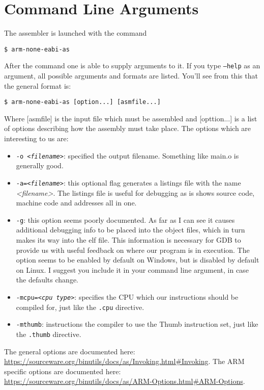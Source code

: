 \section{Command Line Arguments}
The assembler is launched with the command
\begin{lstlisting}[style=BashStyle]
$ arm-none-eabi-as
\end{lstlisting}
After the command one is able to supply arguments to it. If you type \texttt{--help} as an argument, all possible arguments and formats are listed. You'll see from this that the general format is:
\begin{lstlisting}[style=BashStyle]
$ arm-none-eabi-as [option...] [asmfile...]
\end{lstlisting}
Where [asmfile] is the input file which must be assembled and [opttion...] is a list of options describing how the assembly must take place. The options which are interesting to us are:
\begin{itemize}
  \item \texttt{-o \textit{<filename>}}: specified the output filename. Something like main.o is generally good.
  \item \texttt{-a=\textit{<filename>}}: this optional flag generates a listings file with the name \textit{<filename>}. The listings file is useful for debugging as is shows source code, machine code and addresses all in one. 
  \item \texttt{-g}: this option seems poorly documented. As far as I can see it causes additional debugging info to be placed into the object files, which in turn makes its way into the elf file. This information is necessary for GDB to provide us with useful feedback on where our program is in execution. The option seems to be enabled by default on Windows, but is disabled by default on Linux. I suggest you include it in your command line argument, in case the defaults change. 
  \item \texttt{-mcpu=\textit{<cpu type>}}: specifies the CPU which our instructions should be compiled for, just like the \texttt{.cpu} directive.
  \item \texttt{-mthumb}: instructions the compiler to use the Thumb instruction set, just like the \texttt{.thumb} directive. 
\end{itemize}
The general options are documented here: \url{https://sourceware.org/binutils/docs/as/Invoking.html#Invoking}. The ARM specific options are documented here: \url{https://sourceware.org/binutils/docs/as/ARM-Options.html#ARM-Options}.

